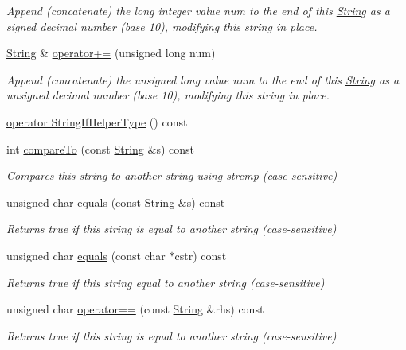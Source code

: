\begin{DoxyCompactItemize}
\begin{DoxyCompactList}\small\item\em Append (concatenate) the long integer value num to the end of this \hyperlink{class_string}{String} as a signed decimal number (base 10), modifying this string in place. \end{DoxyCompactList}\item 
\hyperlink{class_string}{String} \& \hyperlink{class_string_aeaf915e3c8fa71652b2fae59f201a5a2}{operator+=} (unsigned long num)
\begin{DoxyCompactList}\small\item\em Append (concatenate) the unsigned long value num to the end of this \hyperlink{class_string}{String} as a unsigned decimal number (base 10), modifying this string in place. \end{DoxyCompactList}\item 
\hyperlink{class_string_aa15ca61ec96c4068e07c23fea25625fa}{operator String\+If\+Helper\+Type} () const
\item 
int \hyperlink{class_string_ab95c64acc3d5105efdc9709a4cc31e76}{compare\+To} (const \hyperlink{class_string}{String} \&s) const
\begin{DoxyCompactList}\small\item\em Compares this string to another string using strcmp (case-\/sensitive) \end{DoxyCompactList}\item 
unsigned char \hyperlink{class_string_a1f8b83b7dfd47de4062abc3d57e4c351}{equals} (const \hyperlink{class_string}{String} \&s) const
\begin{DoxyCompactList}\small\item\em Returns true if this string is equal to another string (case-\/sensitive) \end{DoxyCompactList}\item 
unsigned char \hyperlink{class_string_add7c8de5fdbebf0fba593d97535228c2}{equals} (const char $\ast$cstr) const
\begin{DoxyCompactList}\small\item\em Returns true if this string equal to another string (case-\/sensitive) \end{DoxyCompactList}\item 
unsigned char \hyperlink{class_string_a21388f8d52ccecd225db7d6724d3e38f}{operator==} (const \hyperlink{class_string}{String} \&rhs) const
\begin{DoxyCompactList}\small\item\em Returns true if this string is equal to another string (case-\/sensitive) \end{DoxyCompactList}\item 

\end{DoxyCompactItemize}
